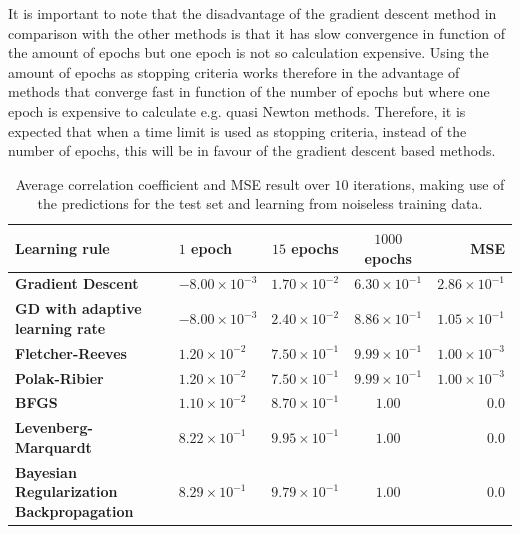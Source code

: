 \documentclass[a4paper,10pt]{article}
\begin{document}
It is important to note that the disadvantage of the gradient descent method in comparison with the other methods is that it has slow convergence in function of the amount of epochs but one epoch is not so calculation expensive. Using the amount of epochs as stopping criteria works therefore in the advantage of methods that converge fast in function of the number of epochs but where one epoch is expensive to calculate e.g. quasi Newton methods. Therefore, it is expected that when a time limit is used as stopping criteria, instead of the number of epochs, this will be in favour of the gradient descent based methods. \\

\begin{table}
	\centering
	\begin{tabular}{@{}l|lccr@{}} \toprule
		\textbf{Learning rule}    & $ 1 $ epoch & $ 15 $ epochs & $ 1000 $ epochs & MSE \\\midrule
		\textbf{Gradient Descent}    & $ -8.00\times10^{-3} $  & $ 1.70\times10^{-2} $  & $ 6.30\times10^{-1} $ & $ 2.86\times10^{-1} $ \\
		\textbf{GD with adaptive learning rate} & $ -8.00\times10^{-3} $  & $ 2.40\times10^{-2} $  & $ 8.86\times10^{-1} $ & $ 1.05\times10^{-1} $  \\
		\textbf{Fletcher-Reeves} & $ 1.20\times10^{-2} $  & $7.50\times10^{-1} $  & $ 9.99\times10^{-1} $ & $ 1.00\times10^{-3} $ \\
		\textbf{Polak-Ribier} & $ 1.20\times10^{-2} $  & $ 7.50\times10^{-1} $  & $ 9.99\times10^{-1} $ & $ 1.00\times10^{-3} $  \\
		\textbf{BFGS} & $ 1.10\times10^{-2} $  & $ 8.70\times10^{-1} $  & $ 1.00 $ & $ 0.0 $ \\
		\textbf{Levenberg-Marquardt} & $ 8.22\times10^{-1} $  & $ 9.95\times10^{-1} $  & $ 1.00 $ & $ 0.0 $ \\
		\textbf{Bayesian Regularization Backpropagation} & $ 8.29\times10^{-1} $  & $ 9.79\times10^{-1}$  & $ 1.00 $ & $ 0.0 $ \\ \bottomrule
	\end{tabular}
	\caption{Average correlation coefficient and MSE result over $ 10 $ iterations, making use of the predictions for the test set and learning from noiseless training data.}
	\label{tab:corr_no_noise}
\end{table}

\end{document}
